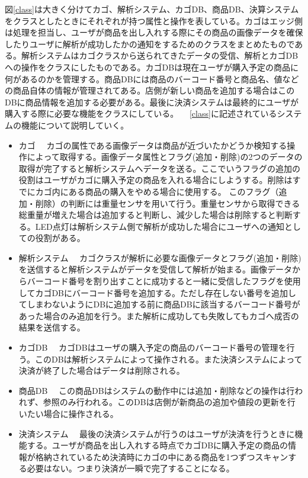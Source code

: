 図\ref{class}は大きく分けてカゴ、解析システム、カゴDB、商品DB、決算システムをクラスとしたときにそれぞれが持つ属性と操作を表している。カゴはエッジ側は処理を担当し、ユーザが商品を出し入れする際にその商品の画像データを確保したりユーザに解析が成功したかの通知をするためのクラスをまとめたものである。解析システムはカゴクラスから送られてきたデータの受信、解析とカゴDBへの操作をクラスにしたものである。カゴDBは現在ユーザが購入予定の商品に何があるのかを管理する。商品DBには商品のバーコード番号と商品名、値などの商品自体の情報が管理されてある。店側が新しい商品を追加する場合はこのDBに商品情報を追加する必要がある。最後に決済システムは最終的にユーザが購入する際に必要な機能をクラスにしている。
　\ref{class}に記述されているシステムの機能について説明していく。
\begin{itemize}
\item カゴ
　カゴの属性である画像データは商品が近づいたかどうか検知する操作によって取得する。画像データ属性とフラグ(追加・削除)の2つのデータの取得が完了すると解析システムへデータを送る。ここでいうフラグの追加の役割はユーザがカゴに購入予定の商品を入れる場合にしようする。削除はすでにカゴ内にある商品の購入をやめる場合に使用する。
このフラグ（追加・削除）の判断には重量センサを用いて行う。重量センサから取得できる総重量が増えた場合は追加すると判断し、減少した場合は削除すると判断する。LED点灯は解析システム側で解析が成功した場合にユーザへの通知としての役割がある。
\item 解析システム
　カゴクラスが解析に必要な画像データとフラグ(追加・削除)を送信すると解析システムがデータを受信して解析が始まる。画像データからバーコード番号を割り出すことに成功すると一緒に受信したフラグを使用してカゴDBにバーコード番号を追加する。ただし存在しない番号を追加してしまわないようにDBに追加する前に商品DBに該当するバーコード番号があった場合のみ追加を行う。また解析に成功しても失敗してもカゴへ成否の結果を送信する。
\item カゴDB
　カゴDBはユーザの購入予定の商品のバーコード番号の管理を行う。このDBは解析システムによって操作される。また決済システムによって決済が終了した場合はデータは削除される。
\item 商品DB
　この商品DBはシステムの動作中には追加・削除などの操作は行われず、参照のみ行われる。このDBは店側が新商品の追加や値段の更新を行いたい場合に操作される。
\item 決済システム
　最後の決済システムが行うのはユーザが決済を行うときに機能する。ユーザが商品を出し入れする時点でカゴDBに購入予定の商品の情報が格納されているため決済時にカゴの中にある商品を1つずつスキャンする必要はない。つまり決済が一瞬で完了することになる。
\end{itemize}

